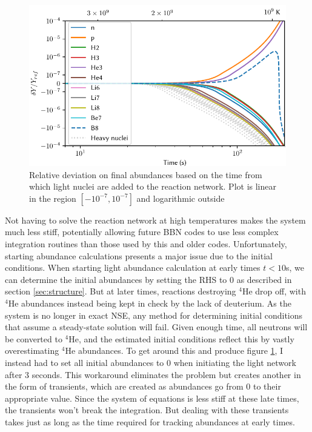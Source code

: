 \begin{figure}[ht]
    \includegraphics[width=5.1in]{figures/midnettime.pdf}
    \caption{Relative deviation on final abundances based on the time from which light nuclei are added to the reaction network. Plot is linear in the region $[-10^{-7},10^{-7}]$ and logarithmic outside}
    \label{fig:midnettime}
\end{figure}
Not having to solve the reaction network at high temperatures makes the system much less stiff, potentially allowing future BBN codes to use less complex integration routines than those used by this and older codes. Unfortunately, starting abundance calculations presents a major issue due to the initial conditions. When starting light abundance calculation at early times $t<10$s, we can determine the initial abundances by setting the RHS to 0 as described in section \ref{sec:structure}. But at later times, reactions destroying ${}^4$He drop off, with ${}^4$He abundances instead being kept in check by the lack of deuterium. As the system is no longer in exact NSE, any method for determining initial conditions that assume a steady-state solution will fail. Given enough time, all neutrons will be converted to ${}^4$He, and the estimated initial conditions reflect this by vastly overestimating ${}^4$He abundances. To get around this and produce figure \ref{fig:midnettime}, I instead had to set all initial abundances to 0 when initiating the light network after 3 seconds. This workaround eliminates the problem but creates another in the form of transients, which are created as abundances go from 0 to their appropriate value. Since the system of equations is less stiff at these late times, the transients won't break the integration. But dealing with these transients takes just as long as the time required for tracking abundances at early times. 


